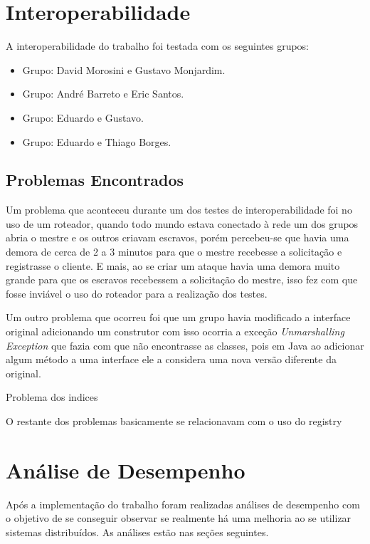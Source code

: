 \documentclass[
	12pt,				%
    oneside,			%
	a4paper,			%
	english,			%
	brazil,				%
	]{abntex2}
\begin{document}
\chapter{Interoperabilidade}
A interoperabilidade do trabalho foi testada com os seguintes grupos:

\begin{itemize}

	\item Grupo: David Morosini e Gustavo Monjardim.
	\item Grupo: André Barreto e Eric Santos.
	\item Grupo: Eduardo e Gustavo.
	\item Grupo: Eduardo e Thiago Borges.

\end{itemize}

\section{Problemas Encontrados}
Um problema que aconteceu durante um dos testes de interoperabilidade foi no uso de um roteador, quando todo mundo estava conectado à rede um dos grupos abria o mestre e os outros criavam escravos, porém percebeu-se que havia uma demora de cerca de 2 a 3 minutos para que o mestre recebesse a solicitação e registrasse o cliente. E mais, ao se criar um ataque havia uma demora muito grande para que os escravos recebessem a solicitação do mestre, isso fez com que fosse inviável o uso do roteador para a realização dos testes.

Um outro problema que ocorreu foi que um grupo havia modificado a interface original adicionando um construtor com isso ocorria a exceção \textit{Unmarshalling Exception} que fazia com que não encontrasse as classes, pois em Java ao adicionar algum método a uma interface ele a considera uma nova versão diferente da original.

Problema dos indices

O restante dos problemas basicamente se relacionavam com o uso do registry

\chapter{Análise de Desempenho} 
Após a implementação do trabalho foram realizadas análises de desempenho com o objetivo de se conseguir observar se realmente
há uma melhoria ao se utilizar sistemas distribuídos. As análises estão nas seções seguintes.
\end{document}
